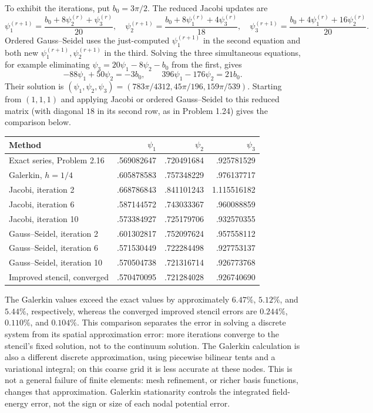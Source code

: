 To exhibit the iterations, put $b_0=3\pi/2$. The reduced Jacobi
updates are
\[
\psi_1^{(r+1)}=\frac{b_0+8\psi_2^{(r)}+\psi_3^{(r)}}{20},\quad
\psi_2^{(r+1)}=\frac{b_0+8\psi_1^{(r)}+4\psi_3^{(r)}}{18},\quad
\psi_3^{(r+1)}=\frac{b_0+4\psi_1^{(r)}+16\psi_2^{(r)}}{20}.
\]
Ordered Gauss--Seidel uses the just-computed $\psi_1^{(r+1)}$
in the second equation and both new $\psi_1^{(r+1)},\psi_2^{(r+1)}$
in the third. Solving the three simultaneous equations, for example
eliminating $\psi_3=20\psi_1-8\psi_2-b_0$ from the first, gives
\[
-88\psi_1+50\psi_2=-3b_0,\qquad
396\psi_1-176\psi_2=21b_0.
\]
Their solution is
$(\psi_1,\psi_2,\psi_3)=(783\pi/4312,45\pi/196,159\pi/539)$.
Starting from $(1,1,1)$ and applying Jacobi or ordered Gauss--Seidel
to this reduced matrix (with diagonal $18$ in its second row, as
in Problem 1.24) gives the comparison below.
\begin{center}
\begin{tabular}{lrrr}
\toprule
Method & $\psi_1$ & $\psi_2$ & $\psi_3$\\\midrule
Exact series, Problem 2.16 & .569082647 & .720491684 & .925781529\\
Galerkin, $h=1/4$ & .605878583 & .757348229 & .976137717\\
Jacobi, iteration 2 & .668786843 & .841101243 & 1.115516182\\
Jacobi, iteration 6 & .587144572 & .743033367 & .960088859\\
Jacobi, iteration 10 & .573384927 & .725179706 & .932570355\\
Gauss--Seidel, iteration 2 & .601302817 & .752097624 & .957558112\\
Gauss--Seidel, iteration 6 & .571530449 & .722284498 & .927753137\\
Gauss--Seidel, iteration 10 & .570504738 & .721316714 & .926773768\\
Improved stencil, converged & .570470095 & .721284028 & .926740690\\
\bottomrule
\end{tabular}
\end{center}
The Galerkin values exceed the exact values by approximately
$6.47\%$, $5.12\%$, and $5.44\%$, respectively, whereas the converged
improved stencil errors are $0.244\%$, $0.110\%$, and $0.104\%$.
This comparison separates the error in solving a discrete system
from its spatial approximation error: more iterations converge to
the stencil's fixed solution, not to the continuum solution. The
Galerkin calculation is also a different discrete approximation,
using piecewise bilinear tents and a variational integral; on this
coarse grid it is less accurate at these nodes. This is not a general
failure of finite elements: mesh refinement, or richer basis functions,
changes that approximation. Galerkin stationarity controls the
integrated field-energy error, not the sign or size of each nodal
potential error.
